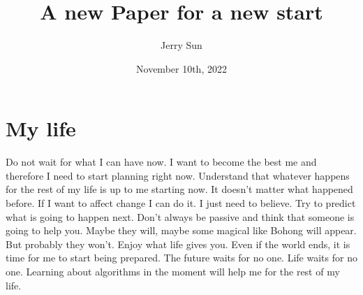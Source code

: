 \documentclass[12pt]{article}
\begin{document}
\title{A new Paper for a new start}
\author{Jerry Sun}
\date{November 10th, 2022}
\maketitle

\section{My life}

Do not wait for what I can have now. I want to become the best me and therefore I need to start planning right now. Understand that whatever happens for the rest of my life is up to me starting now. It doesn't matter what happened before. If I want to affect change I can do it. I just need to believe. Try to predict what is going to happen next. Don't always be passive and think that someone is going to help you. Maybe they will, maybe some magical like Bohong will appear. But probably they won't. Enjoy what life gives you. Even if the world ends, it is time for me to start being prepared. The future waits for no one. Life waits for no one. Learning about algorithms in the moment will help me for the rest of my life. 
\end{document}
